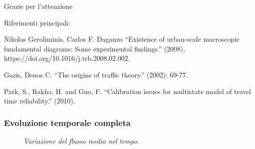 \documentclass[11pt,]{beamer}
\begin{document}

\begin{frame}[plain] %
	\begin{center}
		{\Huge Grazie per l'attenzione}
		
		\bigskip\bigskip %
		
		{\LARGE Riferimenti principali:}
		
		\bigskip
		\small

		Nikolas Geroliminis, Carlos F. Daganzo ``Existence of urban-scale macroscopic fundamental diagrams: Some experimental findings.'' (2008), https://doi.org/10.1016/j.trb.2008.02.002.
		
		\bigskip
		
		Gazis, Denos C. ``The origins of traffic theory.'' (2002): 69-77.
		
		\bigskip
		
		Park, S., Rakha, H. and Guo, F. ``Calibration issues for multistate model of travel time reliability.'' (2010).
	\end{center}
\end{frame}

\begin{frame}[plain]{}
\end{frame}

\begin{frame}
	\frametitle{Evoluzione temporale completa}
	\centering
	\begin{figure}[H]
		\caption{\emph{Variazione del flusso medio nel tempo.}}
		\end{figure}
\end{frame}
\end{document}
